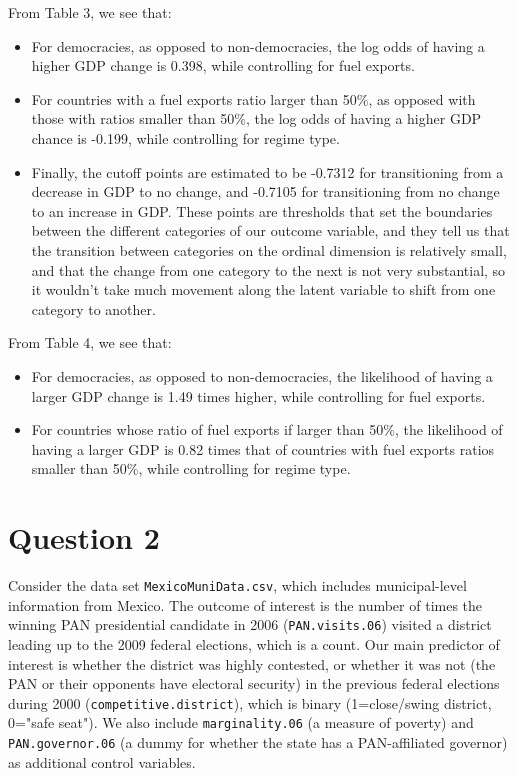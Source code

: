 \documentclass[12pt,letterpaper]{article}
\begin{document}
\begin{enumerate}
	\noindent From Table 3, we see that: 
	\begin{itemize}
		\item For democracies, as opposed to non-democracies, the log odds of having a higher GDP change is 0.398, while controlling for fuel exports. 
		\item For countries with a fuel exports ratio larger than 50\%, as opposed with those with ratios smaller than 50\%, the log odds of having a higher GDP chance is -0.199, while controlling for regime type. 
		\item Finally, the cutoff points are estimated to be -0.7312 for transitioning from a decrease in GDP to no change, and -0.7105 for transitioning from no change to an increase in GDP. These points are thresholds that set the boundaries between the different categories of our outcome variable, and they tell us that the transition between categories on the ordinal dimension is relatively small, and that the change from one category to the next is not very substantial, so it wouldn't take much movement along the latent variable to shift from one category to another.
	\end{itemize}
	
	\noindent From Table 4, we see that: 
	\begin{itemize}
		\item For democracies, as opposed to non-democracies, the likelihood of having a larger GDP change is 1.49 times higher, while controlling for fuel exports. 
		\item For countries whose ratio of fuel exports if larger than 50\%, the likelihood of having a larger GDP is 0.82 times that of countries with fuel exports ratios smaller than 50\%, while controlling for regime type.  
	\end{itemize}
	
\end{enumerate}

\newpage
\section*{Question 2} 
\vspace{.25cm}

\noindent Consider the data set \texttt{MexicoMuniData.csv}, which includes municipal-level information from Mexico. The outcome of interest is the number of times the winning PAN presidential candidate in 2006 (\texttt{PAN.visits.06}) visited a district leading up to the 2009 federal elections, which is a count. Our main predictor of interest is whether the district was highly contested, or whether it was not (the PAN or their opponents have electoral security) in the previous federal elections during 2000 (\texttt{competitive.district}), which is binary (1=close/swing district, 0="safe seat"). We also include \texttt{marginality.06} (a measure of poverty) and \texttt{PAN.governor.06} (a dummy for whether the state has a PAN-affiliated governor) as additional control variables. 
\end{document}
